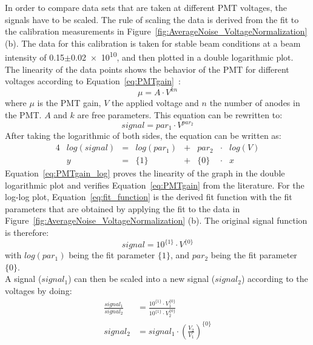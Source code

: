 In order to compare data sets that are taken at different PMT voltages, the signals have to be scaled. 
The rule of scaling the data is derived from the fit to the calibration measurements in Figure~\ref{fig:AverageNoise_VoltageNormalization} (b). 
The data for this calibration is taken for stable beam conditions at a beam intensity of \num{0.15}$\pm$\num{0.02e10}, and then plotted in a double logarithmic plot. 
The linearity of the data points shows the behavior of the PMT for different voltages according to Equation~\ref{eq:PMTgain}~\cite{Hamamatsu}:
\begin{equation}
 \mu = A \cdot V^{kn} 
 \label{eq:PMTgain}
\end{equation}
where $\mu$ is the PMT gain, $V$ the applied voltage and $n$ the number of anodes in the PMT. 
$A$ and $k$ are free parameters. 
This equation can be rewritten to:
\begin{equation}
 signal = par_1 \cdot V^{par_2}
 \label{eq:PMTgain_simple}
\end{equation}
After taking the logarithmic of both sides, the equation can be written as:
\begin{alignat}{4}
 & log(signal) & = & log(par_1) & + & par_2 & \cdot &log(V) \label{eq:PMTgain_log} \\
 & y & = & \{1\} & + & \{0\} & \cdot & x \label{eq:fit_function}
\end{alignat}
Equation~\ref{eq:PMTgain_log} proves the linearity of the graph in the double logarithmic plot and verifies Equation~\ref{eq:PMTgain} from the literature. 
For the log-log plot, Equation~\ref{eq:fit_function} is the derived fit function with the fit parameters that are obtained by applying the fit to the data in Figure~\ref{fig:AverageNoise_VoltageNormalization} (b). 
The original signal function is therefore:
\begin{equation}
 signal = 10^{\{1\}} \cdot V^{\{0\}}
 \label{eq:PMTgain_simple_fitparameters}
\end{equation}
with $log(par_1)$ being the fit parameter $\{1\}$, and $par_2$ being the fit parameter $\{0\}$.\\
A signal ($signal_1$) can then be scaled into a new signal ($signal_2$) according to the voltages by doing:
\begin{align}
 \frac{signal_1}{signal_2} & = \frac{10^{\{1\}}\cdot V_1^{\{0\}}}{10^{\{1\}}\cdot V_2^{\{0\}}} \\
 signal_2 & = signal_1 \cdot \left( \frac{V_2}{V_1} \right) ^{\{0\}}
\end{align}



